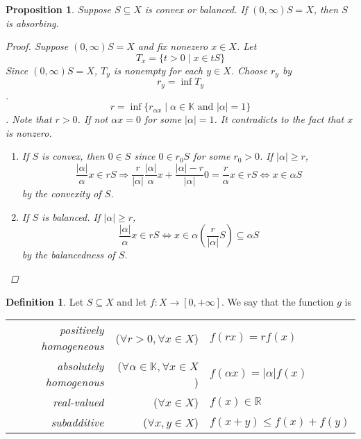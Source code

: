 \documentclass[a4paper,12pt]{article}
\theoremstyle{definition}
\newtheorem{definition}{Definition}
\theoremstyle{plain}
\newtheorem{proposition}{Proposition}
\theoremstyle{remark}
\begin{document}
\begin{proposition}
    \label{absorbing}
    Suppose \(S\subseteq X\) is convex or balanced. If \((0,\infty) S = X\), then \(S\) is absorbing.

    \begin{proof} Suppose \((0,\infty) S = X\) and fix nonezero \(x \in X\). Let
        \[T_x=\{t>0 \mid x \in tS \}\]
        Since \((0,\infty)S = X\), \(T_y\) is nonempty for each \(y \in X\). Choose \(r_y \) by
        \[r_y = \inf T_y \].
        \[r = \inf \{r_{\alpha x} \mid \alpha \in \mathbb{K} \mbox{ and } |\alpha|=1\} \]. Note that \(r>0\). If not \(\alpha x=0\) for some \(|\alpha|=1\). It contradicts to the fact that \(x\) is nonzero.
        \begin{enumerate}
            \item If \(S\) is convex, then \(0 \in S\) since \(0 \in r_0S\) for some \(r_0>0\). If \(|\alpha| \ge r\),
            \[\frac{|\alpha|}{\alpha} x \in rS \Rightarrow \frac{r}{|\alpha|} \frac{|\alpha|}{\alpha} x + \frac{|\alpha|-r}{|\alpha|} 0= \frac{r}{\alpha} x \in rS \Leftrightarrow x \in \alpha S \]
            by the convexity of \(S\).

            \item If \(S\) is balanced. If \(|\alpha|\ge r\),
            \[\frac{|\alpha|}{\alpha} x \in rS \Leftrightarrow x \in \alpha \left(\frac{r}{|\alpha|} S\right) \subseteq \alpha S \]
            by the balancedness of \(S\).
        \end{enumerate}
        
    \end{proof}
\end{proposition}

\begin{definition} Let \(S \subseteq X\) and let \(f: X \to [0,+\infty]\). We say that the function \(g\) is
    \begin{center}
        \begin{tabular}{r r l}
            \emph{positively homogeneous} & (\(\forall r>0, \forall x \in X\)) & \(f(rx) = rf(x) \) \\
            \emph{absolutely homogenous} & (\(\forall \alpha \in \mathbb{K}, \forall x \in X\)) & \(f(\alpha x)= \left \lvert \alpha \right \rvert f(x)\) \\
            \emph{real-valued} & (\(\forall x \in X\)) & \(f(x) \in \mathbb{R}\) \\
            \emph{subadditive} & (\(\forall x,y \in X\)) &\(f(x+y) \le f(x)+f(y)\)
        \end{tabular}
    \end{center}
\end{definition}
\end{document}
